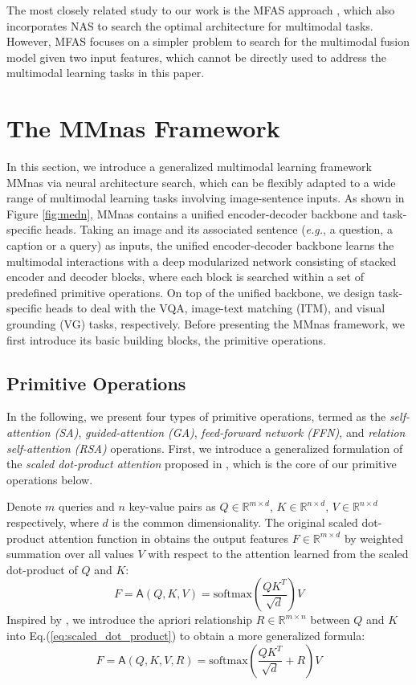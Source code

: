 \documentclass[sigconf]{acmart}
\begin{document}
The most closely related study to our work is the MFAS approach \cite{perez2019mfas}, which also incorporates NAS to search the optimal architecture for multimodal tasks. However, MFAS focuses on a simpler problem to search for the multimodal fusion model given two input features, which cannot be directly used to address the multimodal learning tasks in this paper.


\section{The MMnas Framework}
In this section, we introduce a generalized multimodal learning framework MMnas via neural architecture search, which can be flexibly adapted to a wide range of multimodal learning tasks involving image-sentence inputs. As shown in Figure \ref{fig:medn}, MMnas contains a unified encoder-decoder backbone and task-specific heads. Taking an image and its associated sentence (\emph{e.g.}, a question, a caption or a query) as inputs, the unified encoder-decoder backbone learns the multimodal interactions with a deep modularized network consisting of stacked encoder and decoder blocks, where each block is searched within a set of predefined primitive operations. On top of the unified backbone, we design task-specific heads to deal with the VQA, image-text matching (ITM), and visual grounding (VG) tasks, respectively. Before presenting the MMnas framework, we first introduce its basic building blocks, the primitive operations.

\subsection{Primitive Operations}
In the following, we present four types of primitive operations, termed as the \emph{self-attention (SA)}, \emph{guided-attention (GA)}, \emph{feed-forward network (FFN)}, and \emph{relation self-attention (RSA)} operations. First, we introduce a {generalized formulation} of the \emph{scaled dot-product attention} proposed in \cite{vaswani2017attention}, which is the core of our primitive operations below.

Denote $m$ queries and $n$ key-value pairs as $Q\in\mathbb{R}^{m\times d}$, $K\in\mathbb{R}^{n\times d}$, $V\in\mathbb{R}^{n\times d}$ respectively, where $d$ is the common dimensionality. The original scaled dot-product attention function in \cite{vaswani2017attention} obtains the output features $F\in\mathbb{R}^{m\times d}$ by weighted summation over all values $V$ with respect to the attention learned from the scaled dot-product of $Q$ and $K$:
\begin{equation}\label{eq:scaled_dot_product}
F = \textsf{A}(Q,K,V)=\mathrm{softmax}(\frac{QK^T}{\sqrt{d}})V
\end{equation}
Inspired by \cite{hu2018relation}, we introduce the apriori relationship $R\in\mathbb{R}^{m\times n}$ between $Q$ and $K$ into Eq.(\ref{eq:scaled_dot_product}) to obtain a more generalized formula:
\begin{equation}\label{eq:sdp_relation}
F = \textsf{A}(Q,K,V,R)=\mathrm{softmax}(\frac{QK^T}{\sqrt{d}}+R)V
\end{equation}
\end{document}
